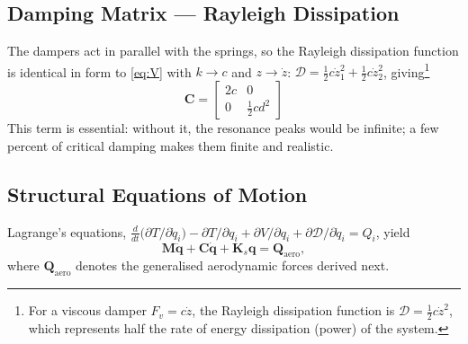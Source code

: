 \documentclass[11pt]{article}
\begin{document}
\subsection{Damping Matrix --- Rayleigh Dissipation}
The dampers act in parallel with the springs, so the Rayleigh dissipation function is
identical in form to \eqref{eq:V} with $k\!\to\!c$ and $z\!\to\!\dot z$:
$\mathcal D=\tfrac12 c\dot z_1^2+\tfrac12 c\dot z_2^2$, giving\footnote{For a viscous damper $F_{v}=c\dot{z}$, the Rayleigh dissipation function is $\mathcal{D}=\frac{1}{2}c\dot{z}^{2}$, which represents half the rate of energy dissipation (power) of the system.}
\begin{equation}
\boxed{\;\mathbf C=\begin{bmatrix} 2c & 0\\[2pt] 0 & \tfrac12 c d^2 \end{bmatrix}\;}
\label{eq:C}
\end{equation}
This term is essential: without it, the resonance peaks would be infinite; a few percent of critical
damping makes them finite and realistic.

\subsection{Structural Equations of Motion}
Lagrange's equations,
$\frac{d}{dt}\!\big(\partial T/\partial\dot q_i\big)-\partial T/\partial q_i
+\partial V/\partial q_i+\partial\mathcal D/\partial\dot q_i=Q_i$,
yield
\begin{equation}
\mathbf M\ddot{\mathbf q}+\mathbf C\dot{\mathbf q}+\mathbf K_s\mathbf q=\mathbf Q_{\text{aero}},
\label{eq:struct-eom}
\end{equation}
where $\mathbf Q_{\text{aero}}$ denotes the generalised aerodynamic forces derived next.
\end{document}
